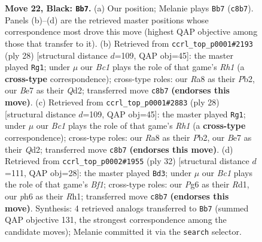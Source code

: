 \documentclass[11pt]{article}
\begin{document}
\begin{figure}[p]
\caption{\textbf{Move 22, Black: \texttt{Bb7}.} (a) Our position; Melanie plays \texttt{Bb7} (\texttt{c8b7}). Panels (b)--(d) are the retrieved master positions whose correspondence most drove this move (highest QAP objective among those that transfer to it). (b) Retrieved from \texttt{ccrl\_top\_p0001\#2193} (ply 28) [structural distance $d$=109, QAP obj=45]: the master played \texttt{Rg1}; under $\mu$ our \emph{Bc1} plays the role of that game's \emph{Rh1} (a \textbf{cross-type} correspondence); cross-type roles: our \emph{R}a8 as their \emph{P}b2, our \emph{B}e7 as their \emph{Q}d2; transferred move \texttt{c8b7} \textbf{(endorses this move)}. (c) Retrieved from \texttt{ccrl\_top\_p0001\#2883} (ply 28) [structural distance $d$=109, QAP obj=45]: the master played \texttt{Rg1}; under $\mu$ our \emph{Bc1} plays the role of that game's \emph{Rh1} (a \textbf{cross-type} correspondence); cross-type roles: our \emph{R}a8 as their \emph{P}b2, our \emph{B}e7 as their \emph{Q}d2; transferred move \texttt{c8b7} \textbf{(endorses this move)}. (d) Retrieved from \texttt{ccrl\_top\_p0002\#1955} (ply 32) [structural distance $d$=111, QAP obj=28]: the master played \texttt{Bd3}; under $\mu$ our \emph{Bc1} plays the role of that game's \emph{Bf1}; cross-type roles: our \emph{P}g6 as their \emph{R}d1, our \emph{p}h6 as their \emph{R}h1; transferred move \texttt{c8b7} \textbf{(endorses this move)}. Synthesis: 4 retrieved analogs transferred to \texttt{Bb7} (summed QAP objective 131, the strongest correspondence among the candidate moves); Melanie committed it via the \texttt{search} selector.}
\label{fig:thought-m43}
\end{figure}

\clearpage
\end{document}
